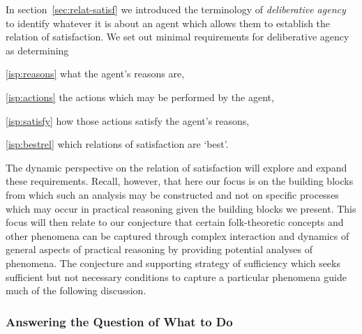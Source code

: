 \documentclass[10pt]{article}
\begin{document}
In section~\ref{sec:relat-satisf} we introduced the terminology of \emph{deliberative agency} to identify whatever it is about an agent which allows them to establish the relation of satisfaction.
We set out minimal requirements for deliberative agency as determining
\begin{enumerate*}[label=(\alph*)]
\item[\ref{isp:reasons}] what the agent's reasons are,
\item[\ref{isp:actions}] the actions which may be performed by the agent,
\item[\ref{isp:satisfy}] how those actions satisfy the agent's reasons,
\item[\ref{isp:bestrel}] which relations of satisfaction are `best'.
\end{enumerate*}
The dynamic perspective on the relation of satisfaction will explore and expand these requirements.
Recall, however, that here our focus is on the building blocks from which such an analysis may be constructed and not on specific processes which may occur in practical reasoning given the building blocks we present.
This focus will then relate to our conjecture that certain folk-theoretic concepts and other phenomena can be captured through complex interaction and dynamics of general aspects of practical reasoning by providing potential analyses of phenomena.
The conjecture and supporting strategy of sufficiency which seeks sufficient but not necessary conditions to capture a particular phenomena guide much of the following discussion.

\subsubsection{Answering the Question of What to Do}
\label{sec:answ-quest-what}
\end{document}
